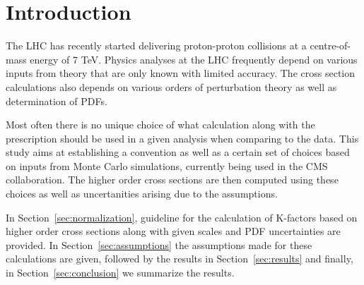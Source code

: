 \section{Introduction}
\label{sec:intro}
The LHC has recently started delivering proton-proton collisions at a centre-of-mass energy of 7 TeV. 
Physics analyses at the LHC frequently depend on various inputs from theory that are only known with
limited accuracy. The cross section calculations also depends on various orders of perturbation theory
as well as determination of PDFs. 

Most often there is no unique choice of what calculation along with the prescription should be used in 
a given analysis when comparing to the data. This study aims at establishing a convention as well 
as a certain set of choices based on inputs from Monte Carlo simulations, currently being used in the 
CMS collaboration. The higher order cross sections are then computed using these choices as well as 
uncertanities arising due to the assumptions.

In Section~\ref{sec:normalization}, guideline for the calculation of K-factors based on higher order cross sections
along with given scales and PDF uncertainties are provided. In Section~\ref{sec:assumptions}
the assumptions made for these calculations are given, followed by the results in Section~\ref{sec:results}
and finally, in Section~\ref{sec:conclusion} we summarize the results.  
